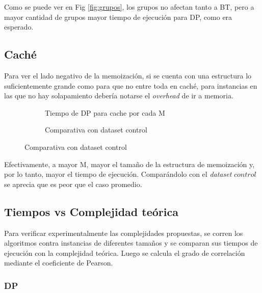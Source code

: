 Como se puede ver en Fig \ref{fig:grupos}, los grupos no afectan tanto a BT, pero a mayor cantidad de grupos mayor tiempo de ejecución para DP, como era esperado.


\subsection{Caché}

Para ver el lado negativo de la memoización, si se cuenta con una estructura lo suficientemente grande como para que no entre toda en caché, para instancias en las que no hay solapamiento debería notarse el \textit{overhead} de ir a memoria.

\begin{figure}[H]
    \centering
    \begin{subfigure}[b]{0.45\textwidth}
        \centering
        
        \caption{Tiempo de DP para cache por cada M}
    \end{subfigure}
    \begin{subfigure}[b]{0.45\textwidth}
        \centering
        
        \caption{Comparativa con dataset control}
    \end{subfigure}
\end{figure}

Efectivamente, a mayor M, mayor el tamaño de la estructura de memoización y, por lo tanto, mayor el tiempo de ejecución. Comparándolo con el \textit{dataset} $control$ se aprecia que es peor que el caso promedio.

\subsection{Tiempos vs Complejidad teórica}

Para verificar experimentalmente las complejidades propuestas, se corren los algoritmos contra instancias de diferentes tamaños y se comparan sus tiempos de ejecución con la complejidad teórica. Luego se calcula el grado de correlación mediante el coeficiente de Pearson.

\subsubsection{DP}

